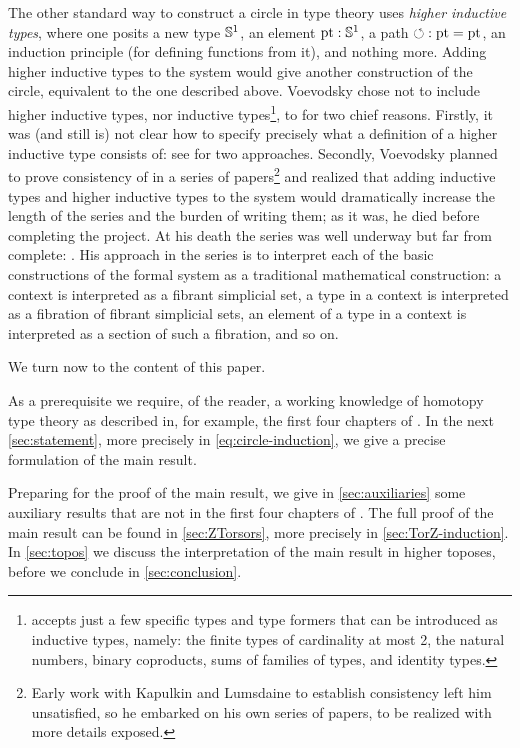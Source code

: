 \documentclass[a4paper,12pt]{amsart}
\begin{document}
The other standard way to construct a circle in type theory uses \emph{higher inductive types}, where one posits a new type ${\mathbb{S}^1}$, an element
${\mathord{\mathrm{pt}}} : {\mathbb{S}^1}$, a path ${\circlearrowleft} : {\mathord{\mathrm{pt}}} = {\mathord{\mathrm{pt}}}$, an induction principle (for defining functions from it), and nothing more.
%
Adding higher inductive types to the system would give another construction of the circle, equivalent to the one described above.
%
Voevodsky chose not to include higher inductive types, nor inductive types\footnote{\UniMath{} accepts just a few specific types
  and type formers that can be introduced as inductive types, namely: the finite types of cardinality at most 2, the natural numbers, binary
  coproducts, sums of families of types, and identity types.},
to \UniMath{} for two chief reasons.
%
Firstly, it was (and still is) not clear how to specify precisely what a definition of a higher inductive type consists of: see
\cite{HoTT-Agda-HIT,1705.07088} for two approaches.
%
Secondly, Voevodsky planned to prove consistency of \UniMath{} in a series of papers\footnote{Early work \cite{1211.2851} with
  Kapulkin and Lumsdaine to establish consistency left him unsatisfied, so he embarked on his own series of papers, to be realized with more details
  exposed.} and realized that adding inductive types and higher inductive types to the system would dramatically increase the length of the
series and the burden of writing them; as it was, he died before completing the project.
%
At his death the series was well underway but far from complete: \cite{103,109,VV-relmonad,112,39,MR3607209,MR3607210}.
%
His approach in the series is to interpret each of the basic constructions of the formal system as a traditional mathematical construction: a
context is interpreted as a fibrant simplicial set, a type in a context is interpreted as a fibration of fibrant simplicial sets, an element of
a type in a context is interpreted as a section of such a fibration, and so on.

We turn now to the content of this paper.

As a prerequisite we require, of the reader, a working knowledge of homotopy type theory
as described in, for example, the first four chapters of \cite{hottbook}.
In the next \cref{sec:statement}, more precisely in \cref{eq:circle-induction},
we give a precise formulation of the main result.

Preparing for the proof of the main result,
we give in \cref{sec:auxiliaries} some auxiliary results
that are not in the first four chapters of \cite{hottbook}.
The full proof of the main result can be found in \cref{sec:ZTorsors},
more precisely in \cref{sec:TorZ-induction}.
In \cref{sec:topos} we discuss the interpretation of the main result
in higher toposes, before we conclude in \cref{sec:conclusion}.
\end{document}
